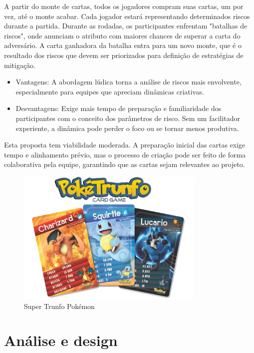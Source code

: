 \documentclass[
	12pt,
	openright,
	twoside,
	a4paper,
	english,
	brazil
	]{abntex2}
\begin{document}
A partir do monte de cartas, todos os jogadores compram suas cartas, um por vez, até o monte acabar. Cada jogador estará representando determinados riscos durante a partida. Durante as rodadas, os participantes enfrentam "batalhas de riscos", onde anunciam o atributo com maiores chances de superar a carta do adversário. A carta ganhadora da batalha entra para um novo monte, que é o resultado dos riscos que devem ser priorizados para definição de estratégias de mitigação.

\begin{itemize}
  \item Vantagens: A abordagem lúdica torna a análise de riscos mais envolvente, especialmente para equipes que apreciam dinâmicas criativas.
  \item Desvantagens: Exige mais tempo de preparação e familiaridade dos participantes com o conceito dos parâmetros de risco. Sem um facilitador experiente, a dinâmica pode perder o foco ou se tornar menos produtiva.
\end{itemize}

Esta proposta tem viabilidade moderada. A preparação inicial das cartas exige tempo e alinhamento prévio, mas o processo de criação pode ser feito de forma colaborativa pela equipe, garantindo que as cartas sejam relevantes ao projeto.

\begin{figure}[H]
  \centering
	\caption{\label{super-trunfo}Super Trunfo Pokémon}
  \includegraphics[width=0.8\textwidth]{super-trunfo}
\end{figure}

\section{Análise e design}
\end{document}
